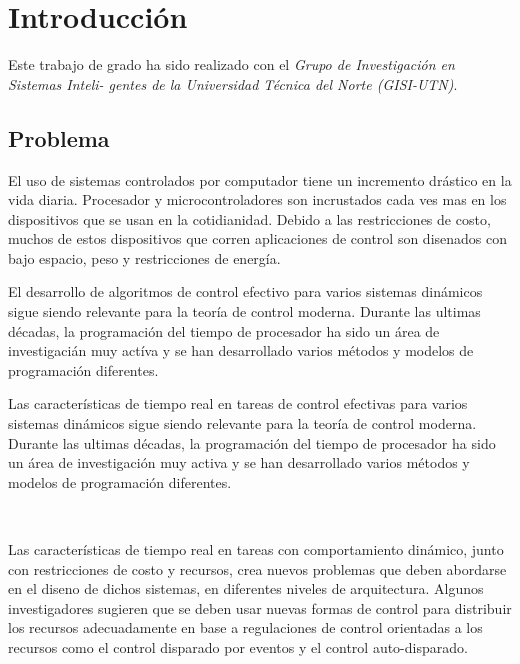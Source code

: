 \documentclass[12pt,a4paper]{book}
\author{Fausto Ortega}
\begin{document}
\chapter[Capitulo 1]{Introducci\'on}

\begin{normalsize}
Este trabajo de grado ha sido realizado con el \textit{Grupo de Investigaci\'on en Sistemas Inteli-
gentes de la Universidad T\'ecnica del Norte (GISI-UTN)}.
\end{normalsize}

\section{Problema}

\begin{normalsize}
El uso de sistemas  controlados por computador tiene un incremento dr\'astico en la vida diaria. Procesador y microcontroladores son incrustados cada ves mas en los dispositivos que se usan en la cotidianidad.
Debido a las restricciones de costo, muchos de estos dispositivos que corren aplicaciones de control son dise\-nados con bajo espacio, peso y restricciones de energ\'ia.
\end{normalsize}

\hfill \break

\begin{normalsize}
El desarrollo de algoritmos de control efectivo para varios sistemas din\'amicos sigue siendo relevante para la teor\'ia de control moderna.
Durante las ultimas d\'ecadas, la programaci\'on del tiempo de procesador ha sido un \'area de investigaci\'an muy act\'iva y se han desarrollado varios m\'etodos y modelos de programaci\'on diferentes.
\end{normalsize}

\hfill \break

\begin{normalsize}
Las caracter\'isticas de tiempo real en tareas de control efectivas para varios sistemas din\'amicos sigue siendo relevante para la teor\'ia de control moderna.
Durante las ultimas d\'ecadas, la programaci\'on del tiempo de procesador ha sido un \'area de investigaci\'on muy activa y se han desarrollado varios m\'etodos y modelos de programaci\'on diferentes.
\end{normalsize}

\hfill \break\\

\begin{normalsize}
Las caracter\'isticas de tiempo real en tareas con comportamiento din\'amico, junto con restricciones de costo y recursos, crea nuevos problemas que deben abordarse en el dise\-no de dichos sistemas, en diferentes niveles de arquitectura. Algunos investigadores sugieren que se deben usar nuevas formas de control para distribuir los recursos adecuadamente en base a regulaciones de control orientadas a los recursos como el control disparado por eventos y el control auto-disparado.
\end{normalsize}
\end{document}
